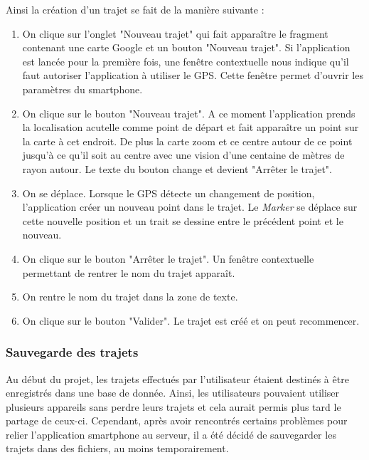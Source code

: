 \documentclass{article}
\begin{document}
Ainsi la création d'un trajet se fait de la manière suivante :
\begin{enumerate}
  \item On clique sur l'onglet "Nouveau trajet" qui fait apparaître le fragment contenant une carte Google et un bouton "Nouveau trajet".
  Si l'application est lancée pour la première fois, une fenêtre contextuelle nous indique qu'il faut autoriser l'application à utiliser le GPS.
  Cette fenêtre permet d'ouvrir les paramètres du smartphone.
  \item On clique sur le bouton "Nouveau trajet". A ce moment l'application prends la localisation acutelle comme point de départ et fait
  apparaître un point sur la carte à cet endroit. De plus la carte zoom et ce centre autour de ce point jusqu'à ce qu'il soit au centre
  avec une vision d'une centaine de mètres de rayon autour. Le texte du bouton change et devient "Arrêter le trajet".
  \item On se déplace. Lorsque le GPS détecte un changement de position, l'application créer un nouveau point dans le trajet. Le \emph{Marker}
  se déplace sur cette nouvelle position et un trait se dessine entre le précédent point et le nouveau.
  \item On clique sur le bouton "Arrêter le trajet". Un fenêtre contextuelle permettant de rentrer le nom du trajet apparaît.
  \item On rentre le nom du trajet dans la zone de texte.
  \item On clique sur le bouton "Valider". Le trajet est créé et on peut recommencer.
\end{enumerate}

\subsubsection{Sauvegarde des trajets}
Au début du projet, les trajets effectués par l'utilisateur étaient destinés à être enregistrés dans une base de donnée. Ainsi, les utilisateurs
pouvaient utiliser plusieurs appareils sans perdre leurs trajets et cela aurait permis plus tard le partage de ceux-ci. Cependant, après avoir
rencontrés certains problèmes pour relier l'application smartphone au serveur, il a été décidé de sauvegarder les trajets dans des fichiers,
au moins temporairement.
\end{document}
